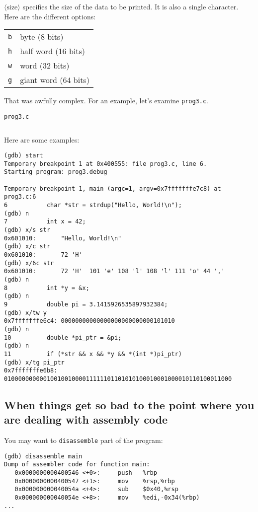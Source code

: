 \documentclass[11pt]{article}
\begin{document}
$\langle\mathrm{size}\rangle$ specifies the size of the data to be printed. It
is also a single character. Here are the different options:

\begin{tabular}{l l}
    \texttt{b} & byte (8 bits) \\
    \texttt{h} & half word (16 bits) \\
    \texttt{w} & word (32 bits) \\
    \texttt{g} & giant word (64 bits) \\
\end{tabular}

That was awfully complex. For an example, let's examine \texttt{prog3.c}.

\begin{listingbox}[left=1cm]{\texttt{prog3.c}}
    \inputminted[linenos]{c}{prog3.c}
\end{listingbox}

Here are some examples:
\begin{termbox}
\begin{verbatim}
(gdb) start
Temporary breakpoint 1 at 0x400555: file prog3.c, line 6.
Starting program: prog3.debug

Temporary breakpoint 1, main (argc=1, argv=0x7fffffffe7c8) at prog3.c:6
6           char *str = strdup("Hello, World!\n");
(gdb) n
7           int x = 42;
(gdb) x/s str
0x601010:       "Hello, World!\n"
(gdb) x/c str
0x601010:       72 'H'
(gdb) x/6c str
0x601010:       72 'H'  101 'e' 108 'l' 108 'l' 111 'o' 44 ','
(gdb) n
8           int *y = &x;
(gdb) n
9           double pi = 3.1415926535897932384;
(gdb) x/tw y
0x7fffffffe6c4: 00000000000000000000000000101010
(gdb) n
10          double *pi_ptr = &pi;
(gdb) n
11          if (*str && x && *y && *(int *)pi_ptr)
(gdb) x/tg pi_ptr
0x7fffffffe6b8: 0100000000001001001000011111101101010100010001000010110100011000
\end{verbatim}
\end{termbox}

\subsection{When things get so bad to the point where you are dealing with assembly code}

You may want to \texttt{disassemble} part of the program:
\begin{termbox}
\begin{verbatim}
(gdb) disassemble main
Dump of assembler code for function main:
   0x0000000000400546 <+0>:     push   %rbp
   0x0000000000400547 <+1>:     mov    %rsp,%rbp
   0x000000000040054a <+4>:     sub    $0x40,%rsp
   0x000000000040054e <+8>:     mov    %edi,-0x34(%rbp)
...
\end{verbatim}
\end{termbox}
\end{document}
